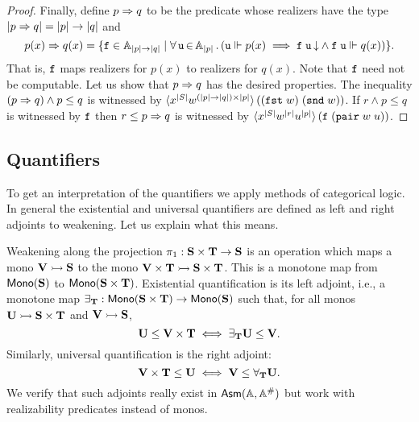 \begin{proof}
  Finally, define $p \Rightarrow q$ to be the predicate whose realizers have
  the type $|p \Rightarrow q| = |p| \to |q|$ and
  \begin{equation*}
    p(x) \Rightarrow q(x) = \{
      \mathtt{f} \in \mathbb{A}_{|p| \to |q|} \mid
      \forall\, \mathtt{u} \,{\in}\, \mathbb{A}_{|p|}\,.\left(
        \mathtt{u} \Vdash p(x)
        \implies
        \mathtt{f}\;\mathtt{u}\,{\downarrow} \land
        \mathtt{f}\;\mathtt{u} \Vdash q(x)
      \right)
    \}.
  \end{equation*}
  That is, $\mathtt{f}$ maps realizers for $p(x)$ to realizers for $q(x)$.
  Note that $\mathtt{f}$ need not be computable. Let us show that $p \Rightarrow
  q$ has the desired properties. The inequality $(p \Rightarrow q) \land p
  \leq q$ is witnessed by $\langle x^{|S|} w^{(|p| \to
      |q|) \times |p|} \rangle\,((\mathtt{fst}\;w)\; (\mathtt{snd}\;w))$. If $r \land p
  \leq q$ is witnessed by $\mathtt{f}$ then $r \leq p \Rightarrow q$ is witnessed
  by $\langle x^{|S|} w^{|r|}
    u^{|p|} \rangle\,(\mathtt{f}\;(\mathtt{pair}\;w\;u))$.
\end{proof}

\subsection{Quantifiers}
\label{sec:quantifiers}

To get an interpretation of the quantifiers we apply methods of
categorical logic. In general the existential and universal
quantifiers are defined as left and right adjoints to weakening. Let
us explain what this means.

Weakening along the projection $\pi_1 : \mathbf{S} \times \mathbf{T} \to
\mathbf{S}$ is an operation which maps a mono $\mathbf{V} \rightarrowtail \mathbf{S}$
to the mono $\mathbf{V} \times \mathbf{T} \rightarrowtail \mathbf{S} \times \mathbf{T}$.
This is a monotone map from $\mathsf{Mono}(\mathbf{S})$ to $\mathsf{Mono}(\mathbf{S} \times
  \mathbf{T})$. Existential quantification is its left adjoint, i.e., a
monotone map $\exists_{\mathbf{T}} : \mathsf{Mono}(\mathbf{S} \times \mathbf{T}) \to
\mathsf{Mono}(\mathbf{S})$ such that, for all monos $\mathbf{U} \rightarrowtail \mathbf{S}
\times \mathbf{T}$ and $\mathbf{V} \rightarrowtail \mathbf{S}$,
%
\begin{equation*}
  \mathbf{U} \leq \mathbf{V} \times \mathbf{T}
  \iff
  \exists_{\mathbf{T}} \mathbf{U} \leq \mathbf{V}.
\end{equation*}
%
Similarly, universal quantification is the right adjoint:
%
\begin{equation*}
  \mathbf{V} \times \mathbf{T} \leq \mathbf{U}
  \iff
  \mathbf{V} \leq \forall_{\mathbf{T}} \mathbf{U}.
\end{equation*}
%
We verify that such adjoints really exist in $\mathsf{Asm}(\mathbb{A},\mathbb{A}^{\#})$ but work with
realizability predicates instead of monos.

